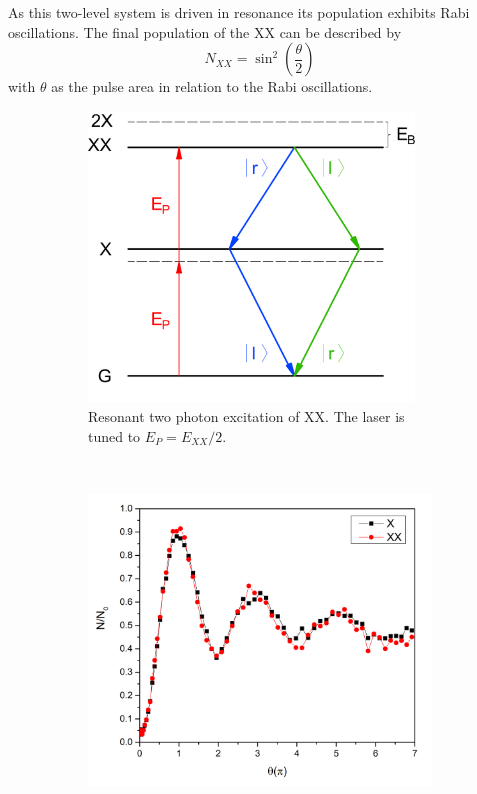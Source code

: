 As this two-level system is driven in resonance its population exhibits Rabi oscillations.
The final population of the \ac{XX} can be described by
\begin{equation}
N_{XX} = \sin^2\left(\frac{\theta}{2}\right)
\end{equation}
with $\theta$ as the pulse area in relation to the Rabi oscillations.
\begin{figure}[H]
	\centering
	\begin{subfigure}[b]{0.48\textwidth}
		\centering
		\includegraphics[width=0.95\textwidth]{figures/quantum-dot/QD_Resonant.pdf}
		\caption{Resonant two photon excitation of \ac{XX}.
			The laser is tuned to $E_P = E_{XX} / 2$.}
		\label{fig:qd-resonant}
	\end{subfigure}%
	~ %
	\begin{subfigure}[b]{0.48\textwidth}
		\centering
		\includegraphics[width=\textwidth]{figures/quantum-dot/Rabi_Oscillations_rel.png}

\end{subfigure}
\end{figure}
